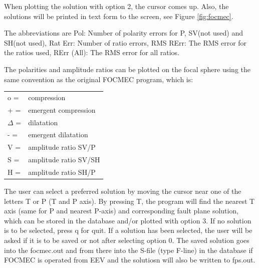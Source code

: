 When plotting the solution with option 2, the cursor comes up. Also, the solutions will be printed in text 
form to the screen, 
see Figure 
\ref{fig:focmec}.


The abbreviations are Pol: Number of polarity errors for P, SV(not used) and SH(not used), Rat Err: Number of ratio errors, RMS RErr: The RMS error for the ratios used, RErr (All): The RMS error for all ratios.

The polarities and amplitude ratios can be plotted on the focal sphere 
using the same convention as the original FOCMEC program, which is: 

\begin{tabular}{ll}
o = & compression \\
+ = & emergent compression \\
$\Delta$ = & dilatation \\
- = & emergent dilatation \\
V = & amplitude ratio SV/P \\
S = & amplitude ratio SV/SH \\
H = & amplitude ratio SH/P \\
\end{tabular}



The user can select a preferred solution by moving the cursor near one of the letters T or P (T and P axis). By pressing T, the program will find the nearest T axis (same for P and nearest P-axis) and corresponding fault plane solution, which can be stored in the database and/or plotted with option 3. If no solution is to be selected, press q for quit. If a solution has been selected, the user will be asked if it is to be saved or not after selecting option 0. The saved solution goes into the 
focmec.out and from there into the S-file (type F-line) in the database if FOCMEC is operated from EEV
and the solutiosn will also be written to fps.out. 

